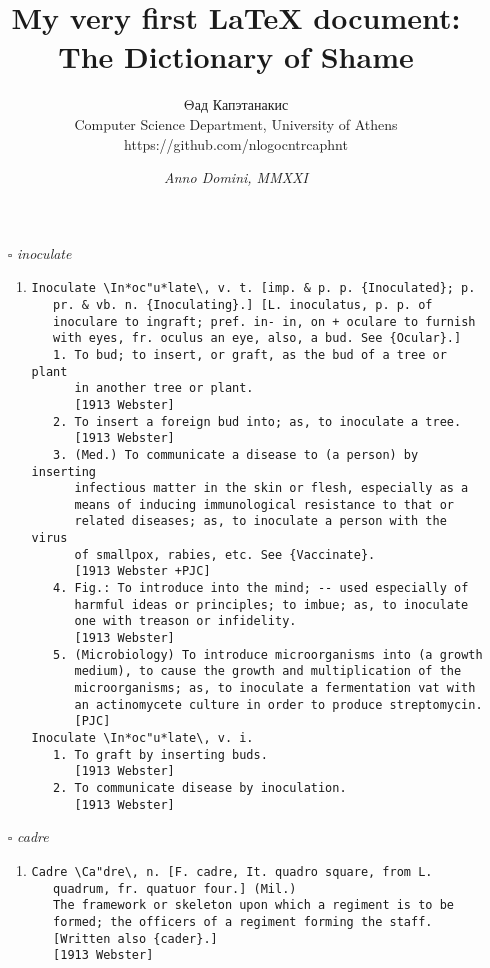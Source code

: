 \documentclass{article}
\author{Θад Капэтанакис\\ {\small Computer Science Department, University of Athens}\\ {\tiny https://github.com/nlogocntrcaphnt}}
\title{My very first {\LaTeX} document: The Dictionary of Shame}
\date{\textit{Anno Domini, MMXXI}}
\begin{document}
	\maketitle
	\renewcommand{\labelenumi}{\Roman{enumi}}
	\begin{itemize}


\item[$\square$] \emph{ inoculate }
\begin{enumerate}
\item{
\begin{lstlisting}
Inoculate \In*oc"u*late\, v. t. [imp. & p. p. {Inoculated}; p.
   pr. & vb. n. {Inoculating}.] [L. inoculatus, p. p. of
   inoculare to ingraft; pref. in- in, on + oculare to furnish
   with eyes, fr. oculus an eye, also, a bud. See {Ocular}.]
   1. To bud; to insert, or graft, as the bud of a tree or plant
      in another tree or plant.
      [1913 Webster]
   2. To insert a foreign bud into; as, to inoculate a tree.
      [1913 Webster]
   3. (Med.) To communicate a disease to (a person) by inserting
      infectious matter in the skin or flesh, especially as a
      means of inducing immunological resistance to that or
      related diseases; as, to inoculate a person with the virus
      of smallpox, rabies, etc. See {Vaccinate}.
      [1913 Webster +PJC]
   4. Fig.: To introduce into the mind; -- used especially of
      harmful ideas or principles; to imbue; as, to inoculate
      one with treason or infidelity.
      [1913 Webster]
   5. (Microbiology) To introduce microorganisms into (a growth
      medium), to cause the growth and multiplication of the
      microorganisms; as, to inoculate a fermentation vat with
      an actinomycete culture in order to produce streptomycin.
      [PJC]
Inoculate \In*oc"u*late\, v. i.
   1. To graft by inserting buds.
      [1913 Webster]
   2. To communicate disease by inoculation.
      [1913 Webster]
\end{lstlisting}}
\end{enumerate}
\item[$\square$] \emph{ cadre }
\begin{enumerate}
\item{
\begin{lstlisting}
Cadre \Ca"dre\, n. [F. cadre, It. quadro square, from L.
   quadrum, fr. quatuor four.] (Mil.)
   The framework or skeleton upon which a regiment is to be
   formed; the officers of a regiment forming the staff.
   [Written also {cader}.]
   [1913 Webster]
\end{lstlisting}}
\end{enumerate}


\end{itemize}
\end{document}

